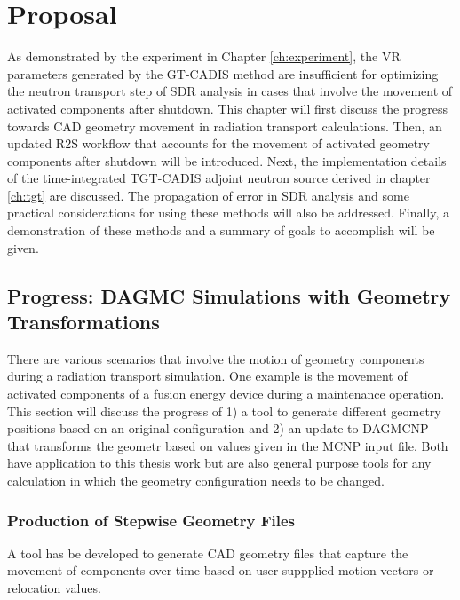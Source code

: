 
\chapter{Proposal}\label{ch:proposal}

As demonstrated by the experiment in Chapter \ref{ch:experiment},  the VR
parameters generated by the GT-CADIS method are insufficient for
optimizing the neutron transport step of SDR analysis in cases that involve the movement 
of activated components after shutdown.  
This chapter will first discuss the progress towards CAD geometry movement in 
radiation transport calculations.
Then, an updated R2S workflow that accounts for the movement of
activated geometry components after shutdown will be introduced.
Next, the implementation details of the time-integrated TGT-CADIS adjoint
neutron source derived in chapter \ref{ch:tgt} are discussed.
The propagation of error
in SDR analysis and some practical considerations for
using these methods will also be addressed. 
Finally, a demonstration of these methods and a
summary of goals to accomplish will be given.

\section{Progress: DAGMC Simulations with Geometry Transformations}\label{sec:dagmc_trans}
There are various scenarios that involve the motion of geometry components 
during a radiation transport simulation.  One example is the movement of
activated components of a fusion energy device during a maintenance operation.
This section will discuss the progress of 1) a tool to generate different 
geometry positions based on an original configuration and
2) an update to DAGMCNP that transforms the geometr based on values given in 
the MCNP input file.  Both have application to this thesis work but are also 
general purpose tools for any calculation in which the geometry configuration 
needs to be changed.

\subsection{Production of Stepwise Geometry Files}\label{sec:timestep_geoms}
A tool has be developed to generate CAD geometry files that capture the 
movement of components over time based on user-suppplied motion vectors or 
relocation values.  

